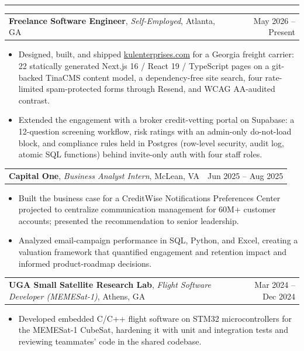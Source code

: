 \documentclass[letterpaper,10pt]{article}
\makeatletter
\newcommand{\IfEmpty}[3]{\if\relax\detokenize{#1}\relax#2\else#3\fi}
\newcommand{\sectiontitle}[1]{\vspace{4pt}{\textbf{\large #1}}\par\vspace{-6pt}\rule{\textwidth}{0.4pt}\par\vspace{1pt}}
\newcommand{\experienceheading}[4]{\begin{tabularx}{\textwidth}{@{}X r@{}}\textbf{#1}\IfEmpty{#2}{}{, \textit{#2}}\IfEmpty{#3}{}{, #3} & #4 \\ \end{tabularx}\par\vspace{1pt}}
\makeatother
\begin{document}
\sectiontitle{EXPERIENCE}
\experienceheading{Freelance Software Engineer}{Self-Employed}{Atlanta, GA}{May 2026 -- Present}
\begin{itemize}
\item Designed, built, and shipped \href{https://www.kulenterprises.com}{kulenterprises.com} for a Georgia freight carrier: 22 statically generated Next.js 16 / React 19 / TypeScript pages on a git-backed TinaCMS content model, a dependency-free site search, four rate-limited spam-protected forms through Resend, and WCAG AA-audited contrast.
\item Extended the engagement with a broker credit-vetting portal on Supabase: a 12-question screening workflow, risk ratings with an admin-only do-not-load block, and compliance rules held in Postgres (row-level security, audit log, atomic SQL functions) behind invite-only auth with four staff roles.
\end{itemize}
\experienceheading{Capital One}{Business Analyst Intern}{McLean, VA}{Jun 2025 -- Aug 2025}
\begin{itemize}
\item Built the business case for a CreditWise Notifications Preferences Center projected to centralize communication management for 60M+ customer accounts; presented the recommendation to senior leadership.
\item Analyzed email-campaign performance in SQL, Python, and Excel, creating a valuation framework that quantified engagement and retention impact and informed product-roadmap decisions.
\end{itemize}
\experienceheading{UGA Small Satellite Research Lab}{Flight Software Developer (MEMESat-1)}{Athens, GA}{Mar 2024 -- Dec 2024}
\begin{itemize}
\item Developed embedded C/C++ flight software on STM32 microcontrollers for the MEMESat-1 CubeSat, hardening it with unit and integration tests and reviewing teammates' code in the shared codebase.
\end{itemize}
\end{document}
